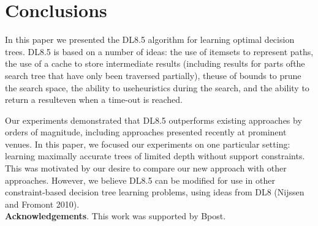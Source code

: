 \section{Conclusions}
In this paper we presented the DL8.5 algorithm for learning optimal decision trees. DL8.5 is based on a number of ideas: the use of itemsets to represent paths, the use of a cache to store intermediate results (including results for parts ofthe search tree that have only been traversed partially), theuse of bounds to prune the search space, the ability to useheuristics during the search, and the ability to return a resulteven when a time-out is reached.

Our experiments demonstrated that DL8.5 outperforms existing approaches by orders of magnitude, including approaches presented recently at prominent venues.
In this paper, we focused our experiments on one particular setting: learning maximally accurate trees of limited depth without support constraints. This was motivated by our desire to compare our new approach with other approaches. However, we believe DL8.5 can be modified for use in other constraint-based decision tree learning problems, using ideas from DL8 (Nijssen and Fromont 2010).\\
\textbf{Acknowledgements}. This work was supported by Bpost.